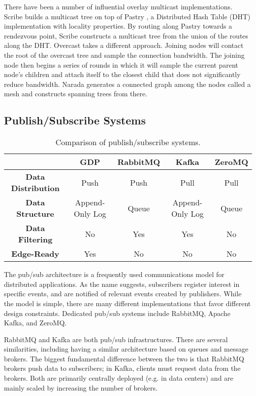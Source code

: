 There have been a number of influential overlay multicast implementations. Scribe \cite{scribe} builds a multicast tree on top of Pastry \cite{pastry}, a Distributed Hash Table (DHT) implementation with locality properties. By routing along Pastry towards a rendezvous point, Scribe constructs a multicast tree from the union of the routes along the DHT. Overcast \cite{overcast} takes a different approach. Joining nodes will contact the root of the overcast tree and sample the connection bandwidth. The joining node then begins a series of rounds in which it will sample the current parent node's children and attach itself to the closest child that does not significantly reduce bandwidth. Narada \cite{narada} generates a connected graph among the nodes called a mesh and constructs spanning trees from there.

\subsection{Publish/Subscribe Systems}
\begin{table}
	\begin{center}
		\begin{tabular}{|c|c|c|c|c|}
			\hline
			& \textbf{GDP} & \textbf{RabbitMQ} & \textbf{Kafka} & \textbf{ZeroMQ} \\
			\hline
			\textbf{Data Distribution} & Push & Push & Pull & Pull \\
			\hline
			\textbf{Data Structure} & Append-Only Log & Queue & Append-Only Log & Queue \\
			\hline
			\textbf{Data Filtering} & No & Yes & Yes & No\\
			\hline
			\textbf{Edge-Ready} & Yes & No & No & No \\
			\hline
		\end{tabular}
	\end{center}
	\caption{Comparison of publish/subscribe systems.}
\end{table}

The pub/sub architecture \cite{pubsub} is a frequently used communications model for distributed applications. As the name suggests, subscribers register interest in specific events, and are notified of relevant events created by publishers. While the model is simple, there are many different implementations that favor different design constraints. Dedicated pub/sub systems include RabbitMQ, Apache Kafka, and ZeroMQ.

RabbitMQ \cite{amqp, amqp-disc} and Kafka \cite{kafka} are both pub/sub infrastructures. There are several similarities, including having a similar architecture based on queues and message brokers. The biggest fundamental difference between the two is that RabbitMQ brokers push data to subscribers; in Kafka, clients must request data from the brokers. Both are primarily centrally deployed (e.g. in data centers) and are mainly scaled by increasing the number of brokers.

